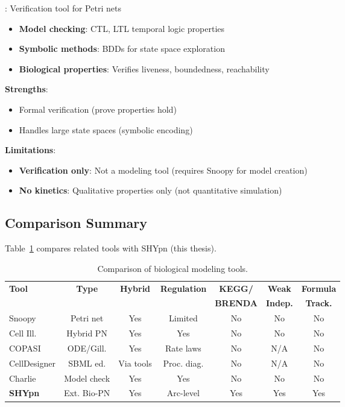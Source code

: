 \textbf{\citet{Heiner2015}}: Verification tool for Petri nets

\begin{itemize}
    \item \textbf{Model checking}: CTL, LTL temporal logic properties
    \item \textbf{Symbolic methods}: BDDs for state space exploration
    \item \textbf{Biological properties}: Verifies liveness, boundedness, reachability
\end{itemize}

\textbf{Strengths}:

\begin{itemize}
    \item Formal verification (prove properties hold)
    \item Handles large state spaces (symbolic encoding)
\end{itemize}

\textbf{Limitations}:

\begin{itemize}
    \item \textbf{Verification only}: Not a modeling tool (requires Snoopy for model creation)
    \item \textbf{No kinetics}: Qualitative properties only (not quantitative simulation)
\end{itemize}

\subsection{Comparison Summary}
\label{subsec:tools-comparison}

Table~\ref{tab:tools-comparison} compares related tools with SHYpn (this thesis).

\begin{table}[htbp]
\centering
\caption{Comparison of biological modeling tools.}
\label{tab:tools-comparison}
\small
\begin{tabular}{lcccccc}
\toprule
\textbf{Tool} & \textbf{Type} & \textbf{Hybrid} & \textbf{Regulation} & \textbf{KEGG/} & \textbf{Weak} & \textbf{Formula} \\
 &  &  &  & \textbf{BRENDA} & \textbf{Indep.} & \textbf{Track.} \\
\midrule
Snoopy & Petri net & Yes & Limited & No & No & No \\
Cell Ill. & Hybrid PN & Yes & Yes & No & No & No \\
COPASI & ODE/Gill. & Yes & Rate laws & No & N/A & No \\
CellDesigner & SBML ed. & Via tools & Proc. diag. & No & N/A & No \\
Charlie & Model check & Yes & Yes & No & No & No \\
\midrule
\textbf{SHYpn} & Ext. Bio-PN & Yes & Arc-level & Yes & Yes & Yes \\
\bottomrule
\end{tabular}
\end{table}

